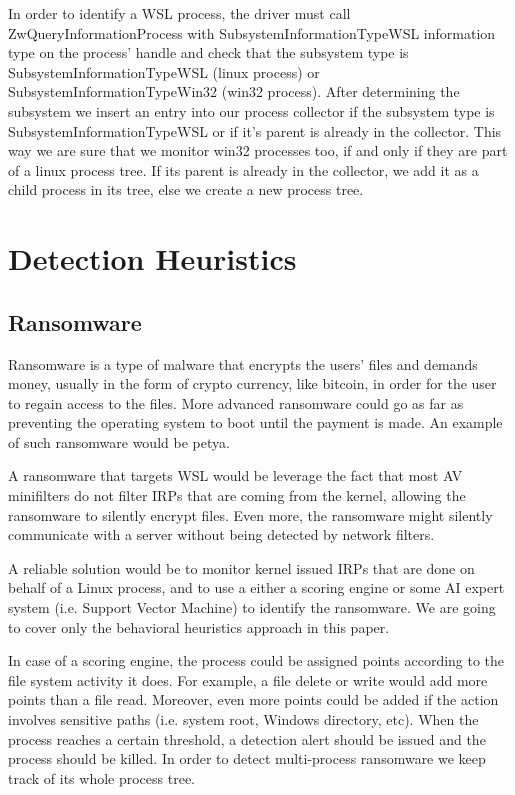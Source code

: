\documentclass[conference]{IEEEtran}
\begin{document}
    \par{}
    In order to identify a WSL process, the driver must call ZwQueryInformationProcess with SubsystemInformationTypeWSL information type on the
    process' handle and check that the subsystem type is SubsystemInformationTypeWSL (linux process) or SubsystemInformationTypeWin32
    (win32 process). After determining the subsystem we insert an entry into our process collector if the subsystem type is
    SubsystemInformationTypeWSL or if it's parent is already in the collector. This way we are sure that we monitor win32 processes too, if and
    only if they are part of a linux process tree. If its parent is already in the collector, we add it as a child process in its tree, else we
    create a new process tree.\\

\section{Detection Heuristics}
    \subsection{Ransomware}
    Ransomware is a type of malware that encrypts the users' files and demands money, usually in the form of crypto currency, like bitcoin,
    in order for the user to regain access to the files. More advanced ransomware could go as far as preventing the operating system to boot
    until the payment is made. An example of such ransomware would be petya.\\

    \par{}
    A ransomware that targets WSL would be leverage the fact that most AV minifilters do not filter IRPs that are coming from the kernel, allowing
    the ransomware to silently encrypt files. Even more, the ransomware might silently communicate with a server without being detected by network
    filters.\\

    \par{}
    A reliable solution would be to monitor kernel issued IRPs that are done on behalf of a Linux process, and to use a either a scoring engine
    or some AI expert system (i.e. Support Vector Machine) to identify the ransomware. We are going to cover only the behavioral heuristics
    approach in this paper.\\

    \par{}
    In case of a scoring engine, the process could be assigned points according to the file system activity it does. For example, a file
    delete or write would add more points than a file read. Moreover, even more points could be added if the action involves sensitive paths
    (i.e. system root, Windows directory, etc). When the process reaches a certain threshold, a detection alert should be issued and the process
    should be killed. In order to detect multi-process ransomware we keep track of its whole process tree.\\
\end{document}

